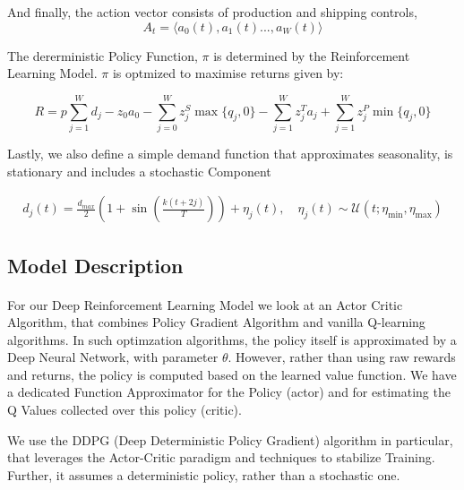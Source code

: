 \documentclass{article}
\begin{document}
And finally, the action vector consists of production and shipping controls,
\begin{equation}
    A_t = \langle a_0(t), a_1(t) ..., a_W(t) \rangle \label{eq:action_fmt}
\end{equation}

The dererministic Policy Function, \( \pi \) is determined by the Reinforcement Learning Model. \( \pi \) is optmized to maximise returns given by:

\begin{equation}
    R = p\sum_{j = 1}^Wd_j - z_0a_0 - \sum_{j = 0}^W z_j^S \max \{q_j, 0 \} - \sum_{j = 1}^W z_j^Ta_j + \sum_{j = 1}^Wz_j^P \min \{q_j, 0 \}
\end{equation}

Lastly, we also define a simple demand function that approximates seasonality, is stationary and includes a stochastic Component

\begin{equation}
    \begin{split}
        d_j(t) = \frac{d_{max}}{2} (1 + \sin(\frac{k (t + 2j)}{T})) + \eta_j(t), \quad
        \eta_j(t) \sim \mathcal{U}(t; \eta_{\min}, \eta_{\max})
    \end{split} 
\end{equation}


\subsection{Model Description}

\paragraph{}
For our Deep Reinforcement Learning Model we look at an Actor Critic Algorithm, that combines Policy Gradient Algorithm and vanilla Q-learning algorithms.  In such optimzation algorithms, the policy itself is approximated by a Deep Neural Network, with parameter \(\theta\). However, rather than using raw rewards and returns, the policy is computed based on the learned value function. We have a dedicated Function Approximator for the Policy (actor) and for estimating the Q Values collected over this policy (critic). 

We use the DDPG (Deep Deterministic Policy Gradient) algorithm in particular, that leverages the Actor-Critic paradigm and techniques to stabilize Training. Further, it assumes a deterministic policy, rather than a stochastic one.
\end{document}
